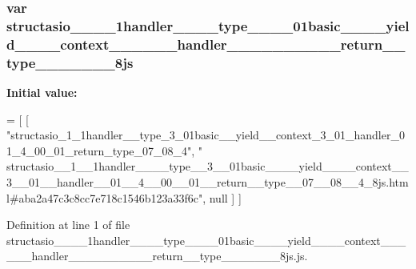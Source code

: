 \subsubsection[{structasio\+\_\+\+\_\+1\+\_\+\+\_\+1handler\+\_\+\+\_\+\+\_\+\+\_\+type\+\_\+\+\_\+3\+\_\+\+\_\+01basic\+\_\+\+\_\+\+\_\+\+\_\+yield\+\_\+\+\_\+\+\_\+\+\_\+context\+\_\+\+\_\+3\+\_\+\+\_\+01\+\_\+\+\_\+handler\+\_\+\+\_\+01\+\_\+\+\_\+4\+\_\+\+\_\+00\+\_\+\+\_\+01\+\_\+\+\_\+return\+\_\+\+\_\+type\+\_\+\+\_\+07\+\_\+\+\_\+08\+\_\+\+\_\+4\+\_\+8js}]{\setlength{\rightskip}{0pt plus 5cm}var structasio\+\_\+\+\_\+\_\+\+\_\+1handler\+\_\+\+\_\+\+\_\+\+\_\+type\+\_\+\+\_\+\_\+\+\_\+01basic\+\_\+\+\_\+\+\_\+\+\_\+yield\+\_\+\+\_\+\+\_\+\+\_\+context\+\_\+\+\_\+\_\+\+\_\+\_\+\+\_\+handler\+\_\+\+\_\+\_\+\+\_\+\_\+\+\_\+\_\+\+\_\+\_\+\+\_\+return\+\_\+\+\_\+type\+\_\+\+\_\+\_\+\+\_\+\_\+\+\_\+\_\+8js}\label{structasio____1____1handler________type____3____01basic________yield________context____3____01__2f7d3963b57b27334dfd2c84895c5409_ade80b052dfb5eb358143f026aa0ac8ee}
{\bfseries Initial value\+:}
\begin{DoxyCode}
=
[
    [ \textcolor{stringliteral}{"structasio\_1\_1handler\_\_type\_3\_01basic\_\_yield\_\_context\_3\_01\_handler\_01\_4\_00\_01\_return\_type\_07\_08\_4"}, \textcolor{stringliteral}{
      "
      structasio\_\_1\_\_1handler\_\_\_\_type\_\_3\_\_01basic\_\_\_\_yield\_\_\_\_context\_\_3\_\_01\_\_handler\_\_01\_\_4\_\_00\_\_01\_\_return\_\_type\_\_07\_\_08\_\_4\_8js.html#aba2a47c3c8cc7e718c1546b123a33f6c"}, null ]
]
\end{DoxyCode}


Definition at line 1 of file structasio\+\_\+\+\_\+\_\+\+\_\+1handler\+\_\+\+\_\+\+\_\+\+\_\+type\+\_\+\+\_\+\_\+\+\_\+01basic\+\_\+\+\_\+\+\_\+\+\_\+yield\+\_\+\+\_\+\+\_\+\+\_\+context\+\_\+\+\_\+\_\+\+\_\+\_\+\+\_\+handler\+\_\+\+\_\+\_\+\+\_\+\_\+\+\_\+\_\+\+\_\+\_\+\+\_\+return\+\_\+\+\_\+type\+\_\+\+\_\+\_\+\+\_\+\_\+\+\_\+\_\+8js.\+js.

